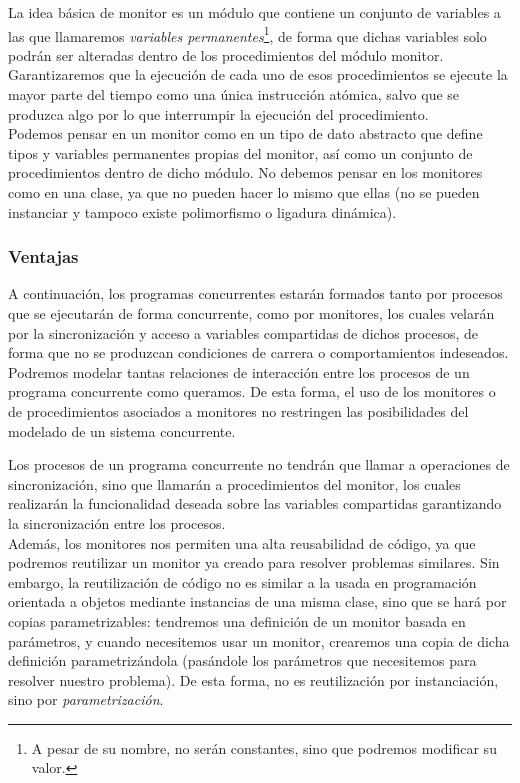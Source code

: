 La idea básica de monitor es un módulo que contiene un conjunto de variables a las que llamaremos \textit{variables permanentes}\footnote{A pesar de su nombre, no serán constantes, sino que podremos modificar su valor.}, de forma que dichas variables solo podrán ser alteradas dentro de los procedimientos del módulo monitor. Garantizaremos que la ejecución de cada uno de esos procedimientos se ejecute la mayor parte del tiempo como una única instrucción atómica, salvo que se produzca algo por lo que interrumpir la ejecución del procedimiento.\\

Podemos pensar en un monitor como en un tipo de dato abstracto que define tipos y variables permanentes propias del monitor, así como un conjunto de procedimientos dentro de dicho módulo. No debemos pensar en los monitores como en una clase, ya que no pueden hacer lo mismo que ellas (no se pueden instanciar y tampoco existe polimorfismo o ligadura dinámica).

\subsubsection{Ventajas}
A continuación, los programas concurrentes estarán formados tanto por procesos que se ejecutarán de forma concurrente, como por monitores, los cuales velarán por la sincronización y acceso a variables compartidas de dichos procesos, de forma que no se produzcan condiciones de carrera o comportamientos indeseados. Podremos modelar tantas relaciones de interacción entre los procesos de un programa concurrente como queramos. De esta forma, el uso de los monitores o de procedimientos asociados a monitores no restringen las posibilidades del modelado de un sistema concurrente. 

Los procesos de un programa concurrente no tendrán que llamar a operaciones de sincronización, sino que llamarán a procedimientos del monitor, los cuales realizarán la funcionalidad deseada sobre las variables compartidas garantizando la sincronización entre los procesos.\\

Además, los monitores nos permiten una alta reusabilidad de código, ya que podremos reutilizar un monitor ya creado para resolver problemas similares. Sin embargo, la reutilización de código no es similar a la usada en programación orientada a objetos mediante instancias de una misma clase, sino que se hará por copias parametrizables: tendremos una definición de un monitor basada en parámetros, y cuando necesitemos usar un monitor, crearemos una copia de dicha definición parametrizándola (pasándole los parámetros que necesitemos para resolver nuestro problema). De esta forma, no es reutilización por instanciación, sino por \textit{parametrización}.\\

